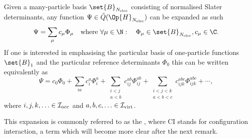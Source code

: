 \begin{rem}
	Given a many-particle basis $\set{B}_{\Nelec}$ consisting
	of normalised Slater determinants,
	any function $\Psi \in \tilde{Q}(\Op{H}_{\Nelec})$
	can be expanded as such
	\begin{align}
		\label{eqn:ExpansionSlaterDeterminant}
		\Psi &= \sum_\mu c_\mu \Phi_\mu
		&\text{where } \forall \mu \in \N: \quad
		\Phi_\mu \in \set{B}_{\Nelec}, c_\mu \in \C.
	\end{align}
	If one is interested in emphasising the particular
	basis of one-particle functions
	$\set{B}_1$ and the particular reference determinants $\Phi_0$
	this can be written equivalently as
	\begin{equation}
		\label{eqn:CIExpansion}
		\Psi
		= c_0 \Phi_0 + \sum_{ia} c_i^a \Phi_i^a
		+ \sum_{\substack{i<j \\a<b}} c_{ij}^{ab} \Phi_{ij}^{ab}
		+ \sum_{\substack{i<j<k \\ a<b<c}} c_{ijk}^{abc} \Phi_{ijk}^{abc}
		 + \cdots,
	\end{equation}
	where $i,j,k, \ldots \in \mathcal{I}_\text{occ}$ and $a,b,c, \ldots \in \mathcal{I}_\text{virt}$.

	This expansion is commonly referred to as the ,
	where CI stands for configuration interaction,
	a term which will become more clear
	after the next remark.
\end{rem}

